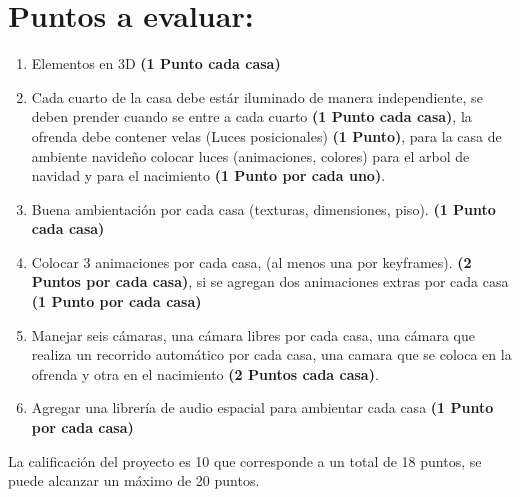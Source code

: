 \documentclass[12pt,letterpaper]{article}
\begin{document}
\section*{Puntos a evaluar:}
\begin{enumerate}
\item Elementos en 3D \textbf{(1 Punto cada casa)}
\item Cada cuarto de la casa debe estár iluminado de manera independiente, se deben prender cuando se entre a cada cuarto \textbf{(1 Punto cada casa)}, la ofrenda debe contener velas (Luces posicionales) \textbf{(1 Punto)}, para la casa de ambiente navideño colocar luces (animaciones, colores) para el arbol de navidad y para el nacimiento \textbf{(1 Punto por cada uno)}.
\item Buena ambientación por cada casa (texturas, dimensiones, piso). \textbf{(1 Punto cada casa)}
\item Colocar 3 animaciones por cada casa, (al menos una por keyframes). \textbf{(2 Puntos por cada casa)}, si se agregan dos animaciones extras por cada casa \textbf{(1 Punto por cada casa)}
\item Manejar seis cámaras, una cámara libres por cada casa, una cámara que realiza un recorrido automático por cada casa, una camara que se coloca en la ofrenda y otra en el nacimiento \textbf{(2 Puntos cada casa)}.
\item Agregar una librería de audio espacial para ambientar cada casa \textbf{(1 Punto por cada casa)}
\end{enumerate}

La calificación del proyecto es 10 que corresponde a un total de 18 puntos, se puede alcanzar un máximo de 20 puntos.
\end{document}
